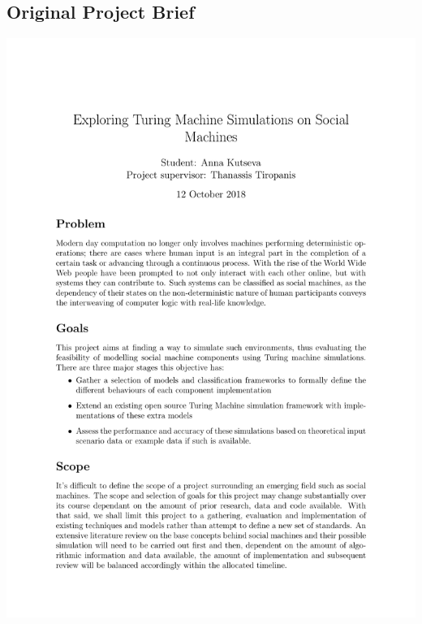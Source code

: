 \documentclass[12pt]{article}
\begin{document}
	\subsection{Original Project Brief}
	\includegraphics[width=\linewidth]{brief}
\end{document}
